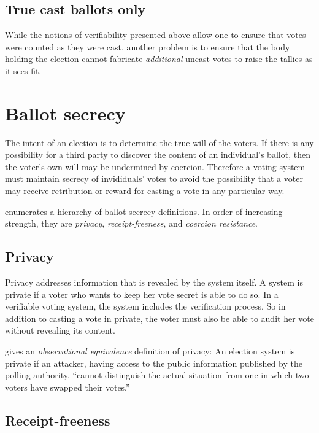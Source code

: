 \documentclass[10pt]{article}
\newcommand{\term}[1]{\textit{#1}}
\begin{document}
\begin{multicols}{2}
\subsection{True cast ballots only}

While the notions of verifiability presented above allow one to ensure that votes were counted as
they were cast, another problem is to ensure that the body holding the election cannot fabricate
\emph{additional} uncast votes to raise the tallies as it sees fit.

\section{Ballot secrecy}

The intent of an election is to determine the true will of the voters.
If there is any possibility for a third party to discover the content of
an individual's ballot, then the voter's own will may be undermined by coercion.
Therefore a voting system must maintain secrecy of invididuals' votes to avoid
the possibility that a voter may receive retribution or reward for casting a vote
in any particular way.

\cite{delaune} enumerates a hierarchy of ballot secrecy definitions.
In order of increasing strength, they are
\term{privacy}, \term{receipt-freeness}, and \term{coercion resistance}.

\subsection{Privacy}

Privacy addresses information that is revealed by the system itself.
A system is private if a voter who wants to keep her vote secret is able to do so.
In a verifiable voting system, the system includes the verification process.
So in addition to casting a vote in private, the voter must also be able to
audit her vote without revealing its content.

\cite{kremer} gives an \term{observational equivalence} definition of privacy:
An election system is private if an attacker, having access to the public
information published by the polling authority, ``cannot distinguish
the actual situation from one in which two voters have swapped their votes.''


\subsection{Receipt-freeness}


\end{multicols}
\end{document}
